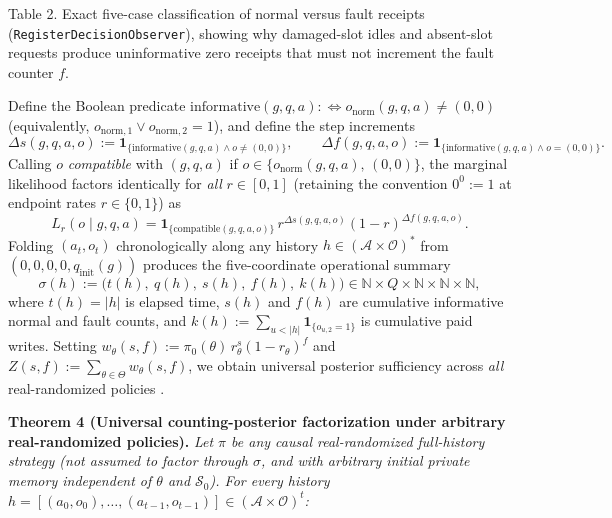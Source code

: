 \documentclass[11pt,letterpaper]{article}
\begin{document}
Table 2. Exact five-case classification of normal versus fault receipts
(\texttt{RegisterDecisionObserver}), showing why damaged-slot idles and
absent-slot requests produce uninformative zero receipts that must not
increment the fault counter \(f\).

Define the Boolean predicate
\(\mathrm{informative}(g, q, a) :\iff o_{\mathrm{norm}}(g, q, a) \neq (0,0)\)
(equivalently, \(o_{\mathrm{norm},1} \lor o_{\mathrm{norm},2} = 1\)),
and define the step increments
\[\Delta s(g, q, a, o) := \mathbf{1}_{\{\mathrm{informative}(g,q,a) \land o \neq (0,0)\}}, \qquad
\Delta f(g, q, a, o) := \mathbf{1}_{\{\mathrm{informative}(g,q,a) \land o = (0,0)\}}.\]
Calling \(o\) \emph{compatible} with \((g, q, a)\) if
\(o \in \{o_{\mathrm{norm}}(g, q, a),\, (0,0)\}\), the marginal
likelihood factors identically for \emph{all} \(r \in [0,1]\) (retaining
the convention \(0^0 := 1\) at endpoint rates \(r \in \{0,1\}\)) as
\[L_r(o \mid g, q, a) = \mathbf{1}_{\{\mathrm{compatible}(g, q, a, o)\}}\, r^{\Delta s(g, q, a, o)} (1 - r)^{\Delta f(g, q, a, o)}.\]
Folding \((a_t, o_t)\) chronologically along any history
\(h \in (\mathcal{A} \times \mathcal{O})^*\) from
\((0, 0, 0, 0, q_{\mathrm{init}}(g))\) produces the five-coordinate
operational summary
\[\sigma(h) := \bigl(t(h),\ q(h),\ s(h),\ f(h),\ k(h)\bigr) \in \mathbb{N} \times Q \times \mathbb{N} \times \mathbb{N} \times \mathbb{N},\]
where \(t(h) = |h|\) is elapsed time, \(s(h)\) and \(f(h)\) are
cumulative informative normal and fault counts, and
\(k(h) := \sum_{u < |h|} \mathbf{1}_{\{o_{u,2} = 1\}}\) is cumulative
paid writes. Setting
\(w_\theta(s, f) := \pi_0(\theta)\, r_\theta^s (1 - r_\theta)^f\) and
\(Z(s, f) := \sum_{\theta \in \Theta} w_\theta(s, f)\), we obtain
universal posterior sufficiency across \emph{all} real-randomized
policies \citep{halmosSavage1949, dynkin1978}.

\textbf{Theorem 4 (Universal counting-posterior factorization under
arbitrary real-randomized policies).} \emph{Let \(\pi\) be any causal
real-randomized full-history strategy (not assumed to factor through
\(\sigma\), and with arbitrary initial private memory independent of
\(\theta\) and \(\mathcal{S}_0\)). For every history
\(h = [(a_0, o_0), \dots, (a_{t-1}, o_{t-1})] \in (\mathcal{A} \times \mathcal{O})^t\):}
\end{document}
